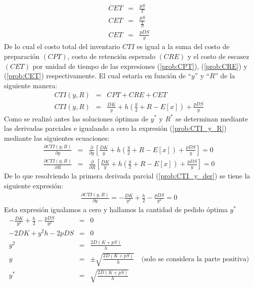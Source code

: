 \begin{eqnarray}
	\label{prob:CET}
	CET &=& \frac{pS}{T} \nonumber \\
	CET &=& \frac{pS}{\frac{y}{D}} \nonumber \\
	CET &=& \frac{pDS}{y}
\end{eqnarray}  
De lo cual el costo total del inventario $CTI$ es igual a la suma del costo de preparación $(CPT)$, costo de retención esperado $(CRE)$ y el costo de escasez $(CET)$ por unidad de tiempo de las expresiones (\ref{prob:CPT}), (\ref{prob:CRE}) y (\ref{prob:CET}) respectivamente. El cual estaría en función de ``$y$'' y ``$R$'' de la siguiente manera:
\begin{eqnarray}
	\label{prob:CTI_y_R}
	CTI(y,R) &=& CPT + CRE + CET \nonumber \\
	CTI(y,R) &=& \frac{DK}{y} + h \left( \frac{y}{2} + R - E[x] \right) + \frac{pDS}{y}
\end{eqnarray}
\newpage
Como se realizó antes las soluciones óptimas de $y^*$ y $R^*$ se determinan mediante las derivadas parciales e igualando a cero la expresión (\ref{prob:CTI_y_R}) mediante las siguientes ecuaciones:
\begin{eqnarray}
	\label{prob:CTI_y_der}
	\frac{\partial CTI(y,R)}{\partial y} &=& \frac{\partial}{\partial y} \left[\frac{DK}{y} + h \left(\frac{y}{2} + R - E[x] \right) + \frac{pDS}{y} \right] = 0 \\
	\label{prob:CTI_R_der}
	\frac{\partial CTI(y,R)}{\partial R} &=& \frac{\partial}{\partial R} \left[\frac{DK}{y} + h \left(\frac{y}{2} + R - E[x] \right) + \frac{pDS}{y} \right] = 0
\end{eqnarray}
De lo que resolviendo la primera derivada parcial (\ref{prob:CTI_y_der}) se tiene la siguiente expresión:
\begin{eqnarray}
	\frac{\partial CTI(y,R)}{\partial y} = - \frac{DK}{y^2} + \frac{h}{2} - \frac{pDS}{y^2} = 0 \nonumber
\end{eqnarray}
Esta expresión igualamos a cero y hallamos la cantidad de pedido óptima $y^*$
\begin{eqnarray}
	\label{prob:y_opt_int}
	- \frac{DK}{y^2} + \frac{h}{2} - \frac{pDS}{y^2} &=& 0 \nonumber \\
	-2DK + y^2 h - 2pDS &=& 0 \nonumber \\
	y^2 &=& \frac{2D(K + pS)}{h} \nonumber \\
	y &=& \pm \sqrt{\frac{2D(K+pS)}{h}} \quad \text{(solo se considera la parte positiva)} \nonumber \\
	y^* &=&  \sqrt{\frac{2D(K+pS)}{h}}
\end{eqnarray}
